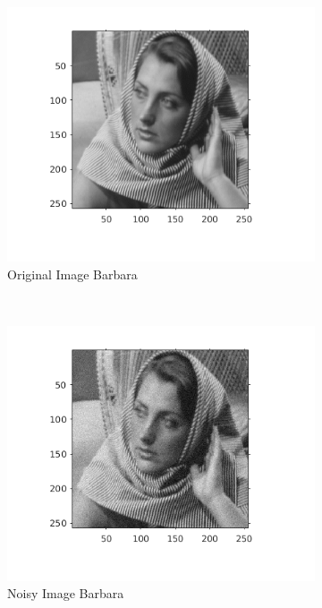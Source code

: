 \documentclass{article}
\begin{document}
\begin{figure}[H]
  \begin{subfigure}[t]{0.32\textwidth}
    \centering
    \includegraphics[scale=0.5]{images/original_image_barbara}
    \caption{Original Image Barbara}
    \label{Fig :1a}
  \end{subfigure}
  ~
  \begin{subfigure}[t]{0.32\textwidth}
    \centering
    \includegraphics[scale=0.5]{images/noisy_image_barbara}
    \caption{Noisy Image Barbara}
    \label{Fig :1b}
  \end{subfigure}
  ~
  \begin{subfigure}[t]{0.32\textwidth}
    \centering

\end{subfigure}
\end{figure}
\end{document}
